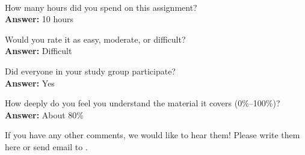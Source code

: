 \documentclass[11pt]{article}
\begin{document}
\begin{debriefing} \hfill\\[-4ex]
\begin{enumerate*}
\item How many hours did you spend on this assignment?\\[0.5mm]
\noindent \textbf{Answer:} 10 hours
\item Would you rate it as easy, moderate, or difficult?\\[0.5mm]
\noindent \textbf{Answer:} Difficult
\item Did everyone in your study group participate?\\[0.5mm]
\noindent \textbf{Answer:} Yes 
\item How deeply do you feel you understand the material it covers (0\%--100\%)?\\[0.5mm]
\noindent \textbf{Answer:} About 80\%
\item If you have any other comments, we would like to hear them!
  Please write them here or send email to
  .
\end{enumerate*}
\end{debriefing}
\end{document}
